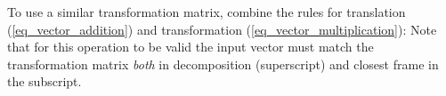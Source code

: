 To use a similar transformation matrix, combine the rules for translation (\ref{eq_vector_addition}) and transformation (\ref{eq_vector_multiplication}):
%
%
Note that for this operation to be valid the input vector must match the transformation matrix \emph{both} in decomposition (superscript) and closest frame in the subscript.



% 
%
%


